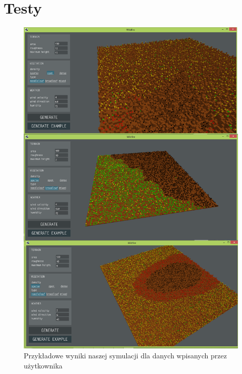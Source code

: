 \documentclass[a4paper, 11pt]{article}
\begin{document}
	\section{Testy}
	\indent
	\begin{figure}[H]
		\centerline{\includegraphics[scale=0.4]{generatetest}}
		\raggedright{	\caption{Przykładowe wyniki naszej symulacji dla danych wpisanych przez użytkownika}}
	\end{figure}
\end{document}
